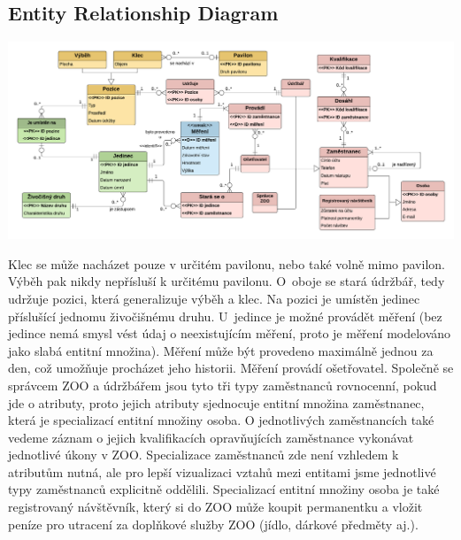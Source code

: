 \newpage
\begin{landscape}
\section{Entity Relationship Diagram}
\thispagestyle{fancy}
\vfill
\centering \includegraphics[scale=0.75, center]{fig/ERD_ZOO.pdf}
\vfill
\end{landscape}

\newpage
Klec se může nacházet pouze v určitém pavilonu, nebo také volně mimo pavilon. Výběh pak nikdy nepřísluší k určitému pavilonu. O~oboje se stará údržbář, tedy udržuje pozici, která generalizuje výběh a klec. Na pozici je umístěn jedinec příslušící jednomu živočišnému druhu. U~jedince je možné provádět měření (bez jedince nemá smysl vést údaj o neexistujícím měření, proto je měření modelováno jako slabá entitní množina). Měření může být provedeno maximálně jednou za den, což umožňuje procházet jeho historii. Měření provádí ošetřovatel. Společně se správcem ZOO a údržbářem jsou tyto tři typy zaměstnanců rovnocenní, pokud jde o atributy, proto jejich atributy sjednocuje entitní množina zaměstnanec, která je specializací entitní množiny osoba. O jednotlivých zaměstnancích také vedeme záznam o jejich kvalifikacích opravňujících zaměstnance vykonávat jednotlivé úkony v ZOO. Specializace zaměstnanců zde není vzhledem k atributům nutná, ale pro lepší vizualizaci vztahů mezi entitami jsme jednotlivé typy zaměstnanců explicitně oddělili. Specializací entitní množiny osoba je také registrovaný návštěvník, který si do ZOO může koupit permanentku a vložit peníze pro utracení za doplňkové služby ZOO (jídlo, dárkové předměty aj.).